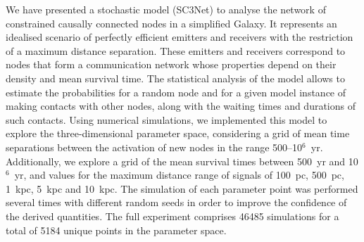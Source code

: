 \documentclass[crop]{CSLB}
\begin{document}
We have presented a stochastic model (SC3Net) to analyse the network of
constrained causally connected nodes in a simplified Galaxy.
%
It represents an idealised scenario of perfectly efficient emitters and
receivers with the restriction of a maximum distance separation.
%
These emitters and receivers correspond to nodes that form a
communication network whose properties depend on their density
and mean survival time.
%
The statistical analysis of the model allows to estimate the
probabilities for a random node and for a given model instance of
making contacts with other nodes, along with the waiting times and
durations of such contacts.
%
Using numerical simulations, we implemented this model to explore the
three-dimensional parameter space, considering a grid of mean time
separations between the activation of new nodes
in the range 500--10$^6$~yr.
%
Additionally, we explore a grid of the mean survival times between 
500~yr and 10$^6$~yr, and values for the maximum distance range of signals 
of 100~pc, 500~pc, 1~kpc, 5~kpc and 10~kpc.
%
The simulation of each parameter point was performed several times
with different random seeds in order to improve the confidence of the
derived quantities.
%
The full experiment comprises 46485 simulations for a total of 5184
unique points in the parameter space.



\end{document}
